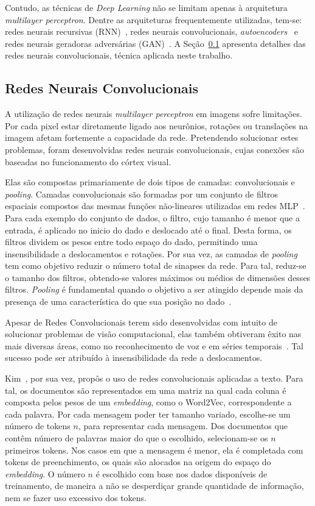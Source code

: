 Contudo, as técnicas de \textit{Deep Learning} não se limitam apenas à arquitetura \textit{multilayer perceptron}.
Dentre as arquiteturas frequentemente utilizadas, tem-se: redes neurais recursivas (RNN)~\cite{hopfield87}, redes neurais
convolucionais, \textit{autoencoders}~\cite{hinton06_2} e redes neurais geradoras adversárias
(GAN)~\cite{goodfellow14_2}.
A Seção~\ref{sec:convolucionais} apresenta detalhes das redes neurais convolucionais, técnica aplicada neste trabalho.

\subsection{Redes Neurais Convolucionais} \label{sec:convolucionais}

A utilização de redes neurais \textit{multilayer perceptron} em imagens sofre limitações.
Por cada pixel estar diretamente ligado aos neurônios, rotações ou translações na imagem afetam fortemente a capacidade
da rede.
Pretendendo solucionar estes problemas, foram desenvolvidas redes neurais convolucionais, cujas conexões são baseadas
no funcionamento do córtex visual.

Elas são compostas primariamente de dois tipos de camadas: convolucionais e \textit{pooling}.
Camadas convolucionais são formadas por um conjunto de filtros espaciais compostos das mesmas funções não-lineares
utilizadas em redes MLP~\cite{goodfellow16}.
Para cada exemplo do conjunto de dados, o filtro, cujo tamanho é menor que a entrada, é aplicado no inicio do dado e
deslocado até o final.
Desta forma, os filtros dividem os pesos entre todo espaço do dado, permitindo uma insensibilidade a deslocamentos e
rotações.
Por sua vez, as camadas de \textit{pooling} tem como objetivo reduzir o número total de sinapses da rede.
Para tal, reduz-se o tamanho dos filtros, obtendo-se valores máximos ou médios de dimensões desses filtros.
\textit{Pooling} é fundamental quando o objetivo a ser atingido depende mais da presença de uma característica do que
sua posição no dado~\cite{goodfellow16}.

Apesar de Redes Convolucionais terem sido desenvolvidas com intuito de solucionar problemas de visão computacional, elas
também obtiveram êxito nas mais diversas áreas, como no reconhecimento de voz e em séries temporais~\cite{lecun95}.
Tal sucesso pode ser atribuído à insensibilidade da rede a deslocamentos.

Kim~\cite{kim14}, por sua vez, propôs o uso de redes convolucionais aplicadas a texto.
Para tal, os documentos são representados em uma matriz na qual cada coluna é composta pelos pesos de um
\textit{embedding}, como o Word2Vec, correspondente a cada palavra.
Por cada mensagem poder ter tamanho variado, escolhe-se um número de tokens $n$, para representar cada mensagem.
Dos documentos que contêm número de palavras maior do que o escolhido, selecionam-se os $n$ primeiros tokens.
Nos casos em que a mensagem é menor, ela é completada com tokens de preenchimento, os quais são alocados na origem do
espaço do \textit{embedding}.
O número $n$ é escolhido com base nos dados disponíveis de treinamento, de maneira a não se desperdiçar grande
quantidade de informação, nem se fazer uso excessivo dos tokens.

